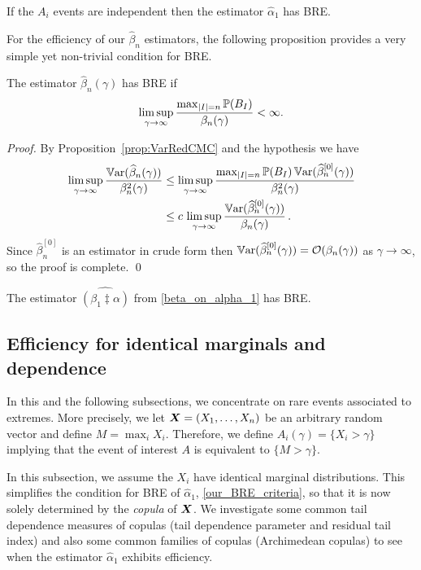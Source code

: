 \begin{Example}
   If the $A_i$ events are independent then the estimator $\hat{\alpha}_1$ has BRE.
\end{Example}

For the efficiency of our $\hat{\beta}_n$ estimators, 
the following proposition provides a very simple yet non-trivial condition for BRE.
\begin{Proposition}
 The estimator $\hat{\beta}_n(\gamma)$ has BRE if
 \begin{equation*}
  \limsup_{\gamma\to\infty}\frac{\max_{|I|=n}\operatorname{{\mathbb P}}(B_I)}{\beta_n(\gamma)}<\infty.
 \end{equation*}
\end{Proposition}
\begin{proof}
By Proposition~\ref{prop:VarRedCMC} and the hypothesis we have
\begin{align*}
 \limsup_{\gamma\to\infty}\frac{\operatorname{\mathbb{V}\mathrm{ar}} (\widehat{\beta}_n(\gamma) )}{\beta_n^2(\gamma)}
 &\le  \limsup_{\gamma\to\infty}\frac{\max_{|I|=n}\operatorname{{\mathbb P}}(B_I)\operatorname{\mathbb{V}\mathrm{ar}} ( \widehat{\beta}_n^{[0]}(\gamma) )}{\beta_n^2(\gamma)}\\
 &\le c\, \limsup_{\gamma\to\infty}\frac{\operatorname{\mathbb{V}\mathrm{ar}}( \widehat{\beta}_n^{[0]}(\gamma) )}{\beta_n(\gamma)} \,.
\end{align*}
Since $\hat{\beta}_n^{[0]}$ is an estimator in crude form
then $\operatorname{\mathbb{V}\mathrm{ar}}( \widehat{\beta}_n^{[0]}(\gamma) )={\mathcal{O}}(\beta_n(\gamma))$ as $\gamma \to \infty$, so the proof
is complete. \qed
\end{proof}
\begin{Corollary}
 The estimator $\widehat{(\beta_1 \ddagger \alpha)}$ from \eqref{beta_on_alpha_1} has BRE.
\end{Corollary}

\subsection{Efficiency for identical marginals and dependence} \label{scn:ident_margs}

In this and the following subsections, we concentrate on rare events associated to 
extremes.  More precisely, we let $\bm{X} = (X_1,\dots,X_n)$ be an arbitrary random vector and define
$M=\max_i X_i$.  Therefore, we define $A_i(\gamma)=\{X_i> \gamma\}$ implying that the event of interest $A$ is equivalent to $\{M>\gamma\}$.

In this subsection, we assume the $X_i$ have identical marginal distributions. This simplifies the condition for BRE of $\hat{\alpha}_1$, \eqref{our_BRE_criteria}, so that it is now solely determined by the \emph{copula} of $\bm{X}$. We investigate some common tail dependence measures of copulas (tail dependence parameter and residual tail index) and also some common families of copulas (Archimedean copulas) to see when the estimator $\hat{\alpha}_1$ exhibits efficiency. 

